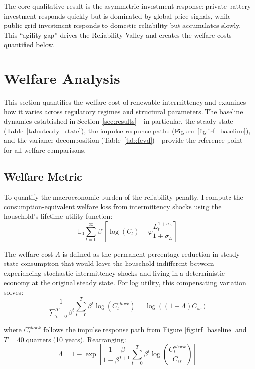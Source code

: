 \documentclass[12pt, a4paper]{article}
\begin{document}
\noindent The core qualitative result is the asymmetric investment response: private battery investment responds quickly but is dominated by global price signals, while public grid investment responds to domestic reliability but accumulates slowly. This ``agility gap'' drives the Reliability Valley and creates the welfare costs quantified below.

\section{Welfare Analysis} \label{sec:welfare}

This section quantifies the welfare cost of renewable intermittency and examines how it varies across regulatory regimes and structural parameters. The baseline dynamics established in Section~\ref{sec:results}---in particular, the steady state (Table~\ref{tab:steady_state}), the impulse response paths (Figure~\ref{fig:irf_baseline}), and the variance decomposition (Table~\ref{tab:fevd})---provide the reference point for all welfare comparisons.

\subsection{Welfare Metric}

To quantify the macroeconomic burden of the reliability penalty, I compute the consumption-equivalent welfare loss from intermittency shocks using the household's lifetime utility function:
\begin{equation}
\mathbb{E}_0 \sum_{t=0}^{\infty} \beta^t \left[ \log(C_t) - \varphi \frac{L_t^{1+\sigma_L}}{1+\sigma_L} \right]
\end{equation}

The welfare cost $\Lambda$ is defined as the permanent percentage reduction in steady-state consumption that would leave the household indifferent between experiencing stochastic intermittency shocks and living in a deterministic economy at the original steady state. For log utility, this compensating variation solves:
\begin{equation}
\frac{1}{\sum_{t=0}^{T} \beta^t} \sum_{t=0}^{T} \beta^t \log(C_t^{shock}) = \log((1-\Lambda)C_{ss})
\end{equation}

where $C_t^{shock}$ follows the impulse response path from Figure \ref{fig:irf_baseline} and $T = 40$ quarters (10 years). Rearranging:
\begin{equation}
\Lambda = 1 - \exp\left[\frac{1-\beta}{1-\beta^{T+1}} \sum_{t=0}^{T} \beta^t \log\left(\frac{C_t^{shock}}{C_{ss}}\right)\right]
\label{eq:welfare_formula}
\end{equation}
\end{document}
